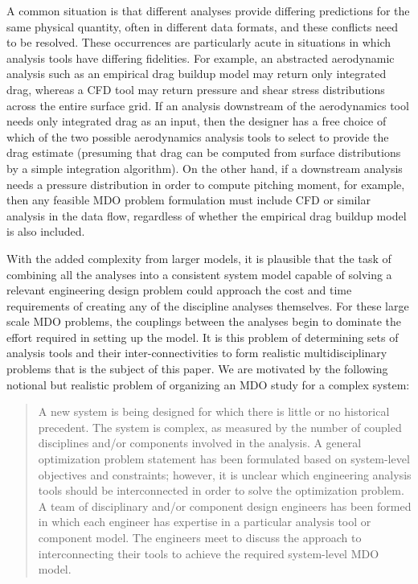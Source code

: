     A common situation is that different analyses provide differing predictions for the
    same physical quantity, often in different data formats, and these conflicts need to be resolved.
    These occurrences are particularly acute in situations in which analysis tools have differing fidelities. For
    example, an abstracted aerodynamic analysis such as an empirical drag buildup model may return only
    integrated drag, whereas a CFD tool may return pressure and shear stress distributions across the entire
    surface grid. If an analysis downstream of the aerodynamics tool needs only integrated drag as an input,
    then the designer has a free choice of which of the two possible aerodynamics analysis tools to select to
    provide the drag estimate (presuming that drag can be computed from surface distributions by a simple
    integration algorithm). On the other hand, if a downstream analysis needs a pressure distribution in
    order to compute pitching moment, for example, then any feasible MDO problem formulation must
    include CFD or similar analysis in the data flow, regardless of whether the empirical drag buildup model
    is also included.

    With the added complexity from larger models, it is plausible that the task of combining all the analyses into a
    consistent system model capable of solving a relevant engineering design
    problem could approach the cost and time requirements of creating any of the discipline
    analyses themselves. For these large scale MDO problems, the couplings between the
    analyses begin to dominate the effort required in setting up the model. It is this problem of
    determining sets of analysis tools and their inter-connectivities to form realistic
    multidisciplinary problems that is the subject of this paper. We are motivated by the following notional
    but realistic problem of organizing an MDO study for a complex system:

    \begin{quote}
    A new system is being designed for which there is little or no historical precedent. The system
    is complex, as measured by the number of coupled disciplines and/or components involved in the
    analysis. A general optimization problem statement has been formulated based on system-level objectives and constraints; however, it is unclear which engineering analysis tools should
    be interconnected in order to solve the optimization problem. A team of disciplinary and/or component design engineers has been formed in which each engineer has expertise in a
    particular analysis tool or component model. The engineers meet to discuss the approach to
    interconnecting their tools to achieve the required system-level MDO model.
    \end{quote}

